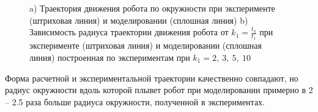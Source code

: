 
\begin{figure}[!ht]
	\begin{minipage}[h]{0.3\linewidth}
	\end{minipage}
	\hfill
	\begin{minipage}[h]{0.7\linewidth}
	\end{minipage}
	\caption{a) Траектория движения робота по окружности при эксперименте (штриховая линия) и моделировании (сплошная линия)  b) Зависимость радиуса траектории движения робота от $k_1 = \frac{t_3}{t_1}$ при эксперименте (штриховая линия) и моделировании (сплошная линия) построенная по экспериментам при $k_1 = 2,\ 3,\ 5,\ 10$ }
	\label{CircleTrajectory}
\end{figure}


Форма расчетной и экспериментальной траектории качественно совпадают, но радиус окружности вдоль которой плывет робот при моделировании примерно в 2 -- 2.5 раза больше радиуса окружности, полученной в экспериментах.

